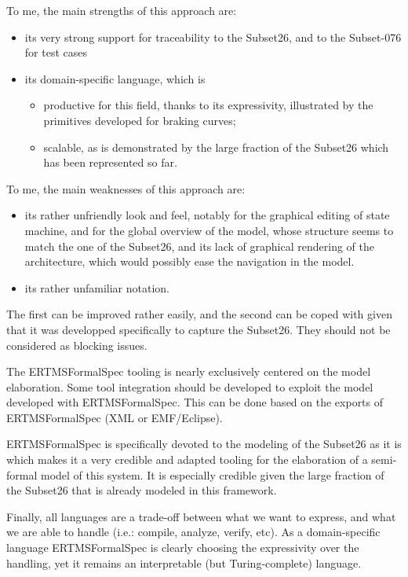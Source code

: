 \begin{assessor1}
To me, the main strengths of this approach are: 
\begin{itemize}
\item its very strong support for traceability to the Subset26, and to the Subset-076 for test cases
\item its domain-specific language, which is
\begin{itemize}
\item productive for this field, thanks to its expressivity, illustrated by the primitives developed for braking curves; 
\item scalable, as is demonstrated by the large fraction of the Subset26 which has been represented so far. 
\end{itemize}
\end{itemize}

To me, the main weaknesses of this approach are: 
\begin{itemize}
\item its rather unfriendly look and feel, notably for the graphical editing of state machine, and for the global overview of the model, whose structure seems to match the one of the Subset26, and its lack of graphical rendering of the architecture, which would possibly ease the navigation in the model. 
\item its rather unfamiliar notation. 
\end{itemize}
The first can be improved rather easily, and the second can be coped with given that it was developped specifically to capture the Subset26. They should not be considered as blocking issues. 

The ERTMSFormalSpec tooling is nearly exclusively centered on the model elaboration. Some tool integration should be developed to exploit the model developed with ERTMSFormalSpec. This can be done based on the exports of ERTMSFormalSpec (XML or EMF/Eclipse). 

ERTMSFormalSpec is specifically devoted to the modeling of the Subset26 as it is which makes it a very credible and adapted tooling for the elaboration of a semi-formal model of this system. It is especially credible given the large fraction of the Subset26 that is already modeled in this framework. 

Finally, all languages are a trade-off between what we want to express, and what we are able to handle (i.e.: compile, analyze, verify, etc). As a domain-specific language ERTMSFormalSpec is clearly choosing the expressivity over the handling, yet it remains an interpretable (but Turing-complete) language. 
\end{assessor1}


